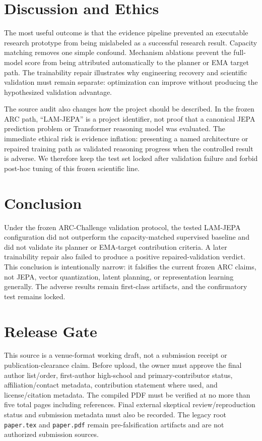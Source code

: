 \documentclass[conference]{IEEEtran}
\begin{document}
\section{Discussion and Ethics}
The most useful outcome is that the evidence pipeline prevented an executable research prototype from being mislabeled as a successful research result. Capacity matching removes one simple confound. Mechanism ablations prevent the full-model score from being attributed automatically to the planner or EMA target path. The trainability repair illustrates why engineering recovery and scientific validation must remain separate: optimization can improve without producing the hypothesized validation advantage.

The source audit also changes how the project should be described. In the frozen ARC path, ``LAM-JEPA'' is a project identifier, not proof that a canonical JEPA prediction problem or Transformer reasoning model was evaluated. The immediate ethical risk is evidence inflation: presenting a named architecture or repaired training path as validated reasoning progress when the controlled result is adverse. We therefore keep the test set locked after validation failure and forbid post-hoc tuning of this frozen scientific line.

\section{Conclusion}
Under the frozen ARC-Challenge validation protocol, the tested LAM-JEPA configuration did not outperform the capacity-matched supervised baseline and did not validate its planner or EMA-target contribution criteria. A later trainability repair also failed to produce a positive repaired-validation verdict. This conclusion is intentionally narrow: it falsifies the current frozen ARC claims, not JEPA, vector quantization, latent planning, or representation learning generally. The adverse results remain first-class artifacts, and the confirmatory test remains locked.

\section*{Release Gate}
This source is a venue-format working draft, not a submission receipt or publication-clearance claim. Before upload, the owner must approve the final author list/order, first-author high-school and primary-contributor status, affiliation/contact metadata, contribution statement where used, and license/citation metadata. The compiled PDF must be verified at no more than five total pages including references. Final external skeptical review/reproduction status and submission metadata must also be recorded. The legacy root \texttt{paper.tex} and \texttt{paper.pdf} remain pre-falsification artifacts and are not authorized submission sources.
\end{document}
